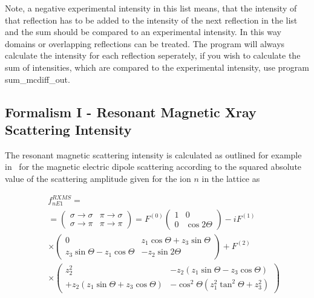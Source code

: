 Note, a negative experimental intensity in this
list means, that the intensity of that reflection has to
be added to the intensity of the next reflection in the list 
and the sum should be compared to an experimental intensity.
In this way domains or overlapping reflections can be treated. 
The program will always calculate the intensity for each reflection
seperately, if you wish to calculate the sum of intensities, which
are compared to the experimental intensity, use program {\prg sum\_mcdiff\_out}.

\subsection{Formalism I - Resonant Magnetic Xray Scattering Intensity}

The resonant magnetic scattering intensity is calculated as outlined for example in~\cite{longfield02-054417}
for the magnetic electric dipole scattering according to the squared absolute value of the scattering
amplitude given for the ion $n$ in the lattice as

\begin{eqnarray}
&&f_{nE1}^{RXMS}=   \\
&&=\left (
\begin{array}{cc}
\sigma \rightarrow \sigma & \pi \rightarrow \sigma \\
\sigma \rightarrow \pi & \pi \rightarrow \pi 
\end{array}
 \right) = F^{(0)}
\left ( \begin{array}{cc}
1 & 0 \\
0 & \cos2\Theta 
\end{array} \right )
-iF^{(1)}  \nonumber \\
&&\times 
\left ( \begin{array}{cc}
0 & z_1 \cos \Theta + z_3 \sin \Theta \\
z_3 \sin \Theta - z_1 \cos \Theta & -z_2 \sin 2\Theta  
\end{array} \right ) + F^{(2)}\nonumber \\
&&\times 
\left ( \begin{array}{cc}
z_2^2 & -z_2(z_1 \sin \Theta - z_3 \cos \Theta) \\
+z_2(z_1 \sin \Theta + z_3 \cos \Theta) & -\cos^2 \Theta (z_1^2 \tan^2 \Theta + z_3^2)
\end{array} \right ) \nonumber \\
\end{eqnarray} 

